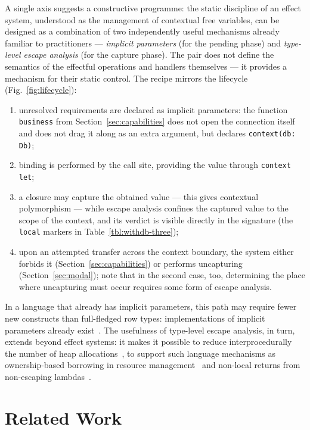 \documentclass[11pt]{article}
\begin{document}
A single axis suggests a constructive programme: the static discipline of an effect
system, understood as the management of contextual free variables, can be designed as a
combination of two independently useful mechanisms already familiar to practitioners ---
\emph{implicit parameters} (for the pending phase) and \emph{type-level escape analysis}
(for the capture phase). The pair does not define the semantics of the effectful
operations and handlers themselves --- it provides a mechanism for their static control.
The recipe mirrors the lifecycle (Fig.~\ref{fig:lifecycle}):
\begin{enumerate}
    \item unresolved requirements are declared as implicit parameters: the function
    \lstinline|business| from Section~\ref{sec:capabilities} does not open the connection
    itself and does not drag it along as an extra argument, but declares
    \lstinline|context(db: Db)|;
    \item binding is performed by the call site, providing the value through
    \lstinline|context let|;
    \item a closure may capture the obtained value --- this gives contextual
    polymorphism --- while escape analysis confines the captured value to the scope of the
    context, and its verdict is visible directly in the signature (the \lstinline|local|
    markers in Table~\ref{tbl:withdb-three});
    \item upon an attempted transfer across the context boundary, the system either
    forbids it (Section~\ref{sec:capabilities}) or performs uncapturing
    (Section~\ref{sec:modal}); note that in the second case, too, determining the place
    where uncapturing must occur requires some form of escape analysis.
\end{enumerate}

In a language that already has implicit parameters, this path may require fewer new
constructs than full-fledged row types: implementations of implicit parameters already
exist~\cite{KEEP-context-parameters, oliveira2010type, lewis2000implicit}. The usefulness
of type-level escape analysis, in turn, extends beyond effect systems: it makes it
possible to reduce interprocedurally the number of heap
allocations~\cite{lorenzen2024oxidizing}, to support such language mechanisms as
ownership-based borrowing in resource
management~\cite{matsakis2014rust, lorenzen2024oxidizing} and non-local
returns from non-escaping lambdas~\cite{akhin2021kotlin}.


\section{Related Work}
\label{sec:related}
\end{document}
